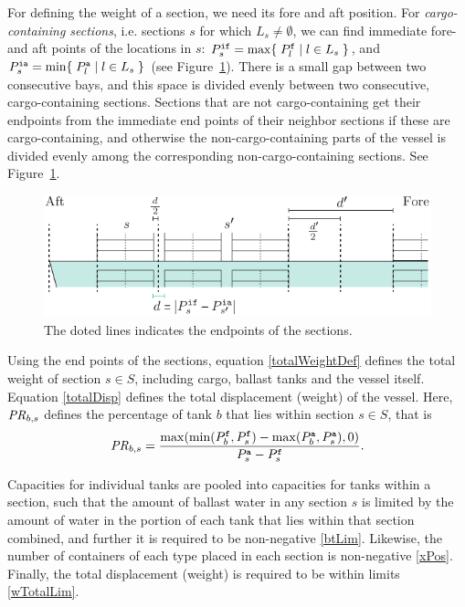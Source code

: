 For defining the weight of a section, we need its fore and aft position. For \emph{cargo-containing sections}, i.e. sections $s$ for which $L_s\neq \emptyset$, we can find immediate fore- and aft points of the locations in $s$: $P^{\texttt{if}}_s = \max\{\;{P^{\texttt{f}}_l}\;|\;{l\in L_s}\;\}$, and $P^{\texttt{ia}}_s = \min\{\;{P^{\texttt{a}}_l}\;|\;{l\in L_s}\;\}$ (see Figure~\ref{fig:sections}). There is a small gap between two consecutive bays, and this space is divided evenly between two consecutive, cargo-containing sections. Sections that are not cargo-containing get their endpoints from the immediate end points of their neighbor sections if these are cargo-containing, and otherwise the non-cargo-containing parts of the vessel is divided evenly among the corresponding non-cargo-containing sections. See Figure~\ref{fig:sections}.
\begin{figure}[htbp]
	\centering
		\includegraphics{figures/sections.pdf}
	\caption{The doted lines indicates the endpoints of the sections.}
	\label{fig:sections}
\end{figure}
Using the end points of the sections, equation \eqref{totalWeightDef} defines the total weight of section $s\in S$, including cargo, ballast tanks and the vessel itself. Equation \eqref{totalDisp} defines the total displacement (weight) of the vessel.  Here, $\mathit{PR}_{b,s}$ defines the percentage of tank $b$ that lies within section $s\in S$, that is 
\[
\mathit{PR}_{b,s} = \frac{\max(\min(P^\texttt{f}_b, P^\texttt{f}_s)-\max(P^\texttt{a}_b, P^\texttt{a}_s),0)}{P^\texttt{a}_s-P^\texttt{f}_s}.
\]

Capacities for individual tanks are pooled into capacities for tanks within a section, such that the amount of ballast water in any section $s$ is limited by the amount of water in the portion of each tank that lies within that section combined, and further it is required to be non-negative \eqref{btLim}. Likewise, the number of containers of each type placed in each section is non-negative \eqref{xPos}. Finally, the total displacement (weight) is required to be within limits \eqref{wTotalLim}.

